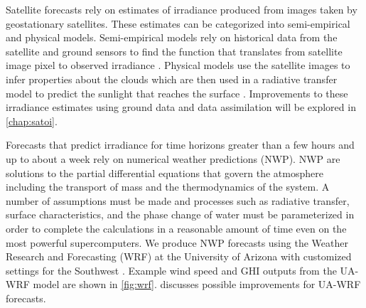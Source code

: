 Satellite forecasts rely on estimates of irradiance produced from
images taken by geostationary satellites.
These estimates can be categorized into semi-empirical and physical models.
Semi-empirical models rely on historical data from the satellite and
ground sensors to find the function that translates from satellite
image pixel to observed irradiance \citep{Perez2013a}.
Physical models use the satellite images to infer properties about the
clouds which are then used in a radiative transfer model to predict
the sunlight that reaches the surface \citep{Miller2013}.
Improvements to these irradiance estimates using ground data and data
assimilation will be explored in \cref{chap:satoi}.

Forecasts that predict irradiance for time horizons greater than a few
hours and up to about a week rely on numerical weather predictions
(NWP).
NWP are solutions to the partial differential equations that govern
the atmosphere including the transport of mass and the thermodynamics
of the system.
A number of assumptions must be made and processes such as radiative
transfer, surface characteristics, and the phase change of water must
be parameterized in order to complete the calculations in a reasonable
amount of time even on the most powerful supercomputers.
We produce NWP forecasts using the Weather Research and Forecasting
(WRF) \citep{Skamarock2008} at the University of Arizona with customized
settings for the Southwest \citep{Leuthold}.
Example wind speed and GHI outputs from the UA-WRF model are shown in
\cref{fig:wrf}.
 discusses possible improvements for
UA-WRF forecasts.

